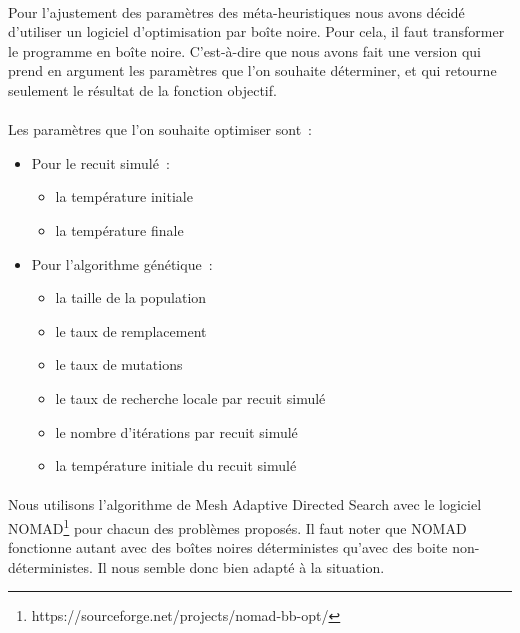 \documentclass[12pt,letterpaper,twoside]{article}
\begin{document}
			\paragraph*{}
				Pour l'ajustement des paramètres des méta-heuristiques nous avons décidé d'utiliser un logiciel d'optimisation par boîte noire.
				Pour cela, il faut transformer le programme en boîte noire.
				C'est-à-dire que nous avons fait une version qui prend en argument les paramètres que l'on souhaite déterminer, et
				qui retourne seulement le résultat de la fonction objectif.

			\paragraph*{}
				Les paramètres que l'on souhaite optimiser sont~:
				\begin{itemize}
					\item Pour le recuit simulé~:
						\begin{itemize}
							\item la température initiale
							\item la température finale
						\end{itemize}
					\item Pour l'algorithme génétique~:
						\begin{itemize}
							\item la taille de la population
							\item le taux de remplacement
							\item le taux de mutations
							\item le taux de recherche locale par recuit simulé
							\item le nombre d'itérations par recuit simulé
							\item la température initiale du recuit simulé
						\end{itemize}
				\end{itemize}

			\paragraph*{}
				Nous utilisons l'algorithme de Mesh Adaptive Directed Search avec le logiciel NOMAD\footnote{{https://sourceforge.net/projects/nomad-bb-opt/}}
				pour chacun des problèmes proposés.
				Il faut noter que NOMAD fonctionne autant avec des boîtes noires déterministes qu'avec des boite non-déterministes.
				Il nous semble donc bien adapté à la situation.
\end{document}

